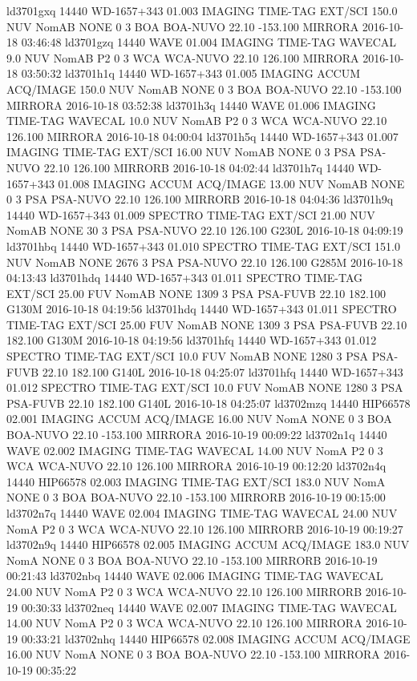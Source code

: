 ld3701gxq 14440 WD-1657+343 01.003 IMAGING TIME-TAG EXT/SCI 150.0 NUV NomAB NONE 0 3 BOA BOA-NUVO 22.10 -153.100 MIRRORA 2016-10-18 03:46:48
ld3701gzq 14440 WAVE 01.004 IMAGING TIME-TAG WAVECAL 9.0 NUV NomAB P2 0 3 WCA WCA-NUVO 22.10 126.100 MIRRORA 2016-10-18 03:50:32
ld3701h1q 14440 WD-1657+343 01.005 IMAGING ACCUM ACQ/IMAGE 150.0 NUV NomAB NONE 0 3 BOA BOA-NUVO 22.10 -153.100 MIRRORA 2016-10-18 03:52:38
ld3701h3q 14440 WAVE 01.006 IMAGING TIME-TAG WAVECAL 10.0 NUV NomAB P2 0 3 WCA WCA-NUVO 22.10 126.100 MIRRORA 2016-10-18 04:00:04
ld3701h5q 14440 WD-1657+343 01.007 IMAGING TIME-TAG EXT/SCI 16.00 NUV NomAB NONE 0 3 PSA PSA-NUVO 22.10 126.100 MIRRORB 2016-10-18 04:02:44
ld3701h7q 14440 WD-1657+343 01.008 IMAGING ACCUM ACQ/IMAGE 13.00 NUV NomAB NONE 0 3 PSA PSA-NUVO 22.10 126.100 MIRRORB 2016-10-18 04:04:36
ld3701h9q 14440 WD-1657+343 01.009 SPECTRO TIME-TAG EXT/SCI 21.00 NUV NomAB NONE 30 3 PSA PSA-NUVO 22.10 126.100 G230L 2016-10-18 04:09:19
ld3701hbq 14440 WD-1657+343 01.010 SPECTRO TIME-TAG EXT/SCI 151.0 NUV NomAB NONE 2676 3 PSA PSA-NUVO 22.10 126.100 G285M 2016-10-18 04:13:43
ld3701hdq 14440 WD-1657+343 01.011 SPECTRO TIME-TAG EXT/SCI 25.00 FUV NomAB NONE 1309 3 PSA PSA-FUVB 22.10 182.100 G130M 2016-10-18 04:19:56
ld3701hdq 14440 WD-1657+343 01.011 SPECTRO TIME-TAG EXT/SCI 25.00 FUV NomAB NONE 1309 3 PSA PSA-FUVB 22.10 182.100 G130M 2016-10-18 04:19:56
ld3701hfq 14440 WD-1657+343 01.012 SPECTRO TIME-TAG EXT/SCI 10.0 FUV NomAB NONE 1280 3 PSA PSA-FUVB 22.10 182.100 G140L 2016-10-18 04:25:07
ld3701hfq 14440 WD-1657+343 01.012 SPECTRO TIME-TAG EXT/SCI 10.0 FUV NomAB NONE 1280 3 PSA PSA-FUVB 22.10 182.100 G140L 2016-10-18 04:25:07
ld3702mzq 14440 HIP66578 02.001 IMAGING ACCUM ACQ/IMAGE 16.00 NUV NomA NONE 0 3 BOA BOA-NUVO 22.10 -153.100 MIRRORA 2016-10-19 00:09:22
ld3702n1q 14440 WAVE 02.002 IMAGING TIME-TAG WAVECAL 14.00 NUV NomA P2 0 3 WCA WCA-NUVO 22.10 126.100 MIRRORA 2016-10-19 00:12:20
ld3702n4q 14440 HIP66578 02.003 IMAGING TIME-TAG EXT/SCI 183.0 NUV NomA NONE 0 3 BOA BOA-NUVO 22.10 -153.100 MIRRORB 2016-10-19 00:15:00
ld3702n7q 14440 WAVE 02.004 IMAGING TIME-TAG WAVECAL 24.00 NUV NomA P2 0 3 WCA WCA-NUVO 22.10 126.100 MIRRORB 2016-10-19 00:19:27
ld3702n9q 14440 HIP66578 02.005 IMAGING ACCUM ACQ/IMAGE 183.0 NUV NomA NONE 0 3 BOA BOA-NUVO 22.10 -153.100 MIRRORB 2016-10-19 00:21:43
ld3702nbq 14440 WAVE 02.006 IMAGING TIME-TAG WAVECAL 24.00 NUV NomA P2 0 3 WCA WCA-NUVO 22.10 126.100 MIRRORB 2016-10-19 00:30:33
ld3702neq 14440 WAVE 02.007 IMAGING TIME-TAG WAVECAL 14.00 NUV NomA P2 0 3 WCA WCA-NUVO 22.10 126.100 MIRRORA 2016-10-19 00:33:21
ld3702nhq 14440 HIP66578 02.008 IMAGING ACCUM ACQ/IMAGE 16.00 NUV NomA NONE 0 3 BOA BOA-NUVO 22.10 -153.100 MIRRORA 2016-10-19 00:35:22
